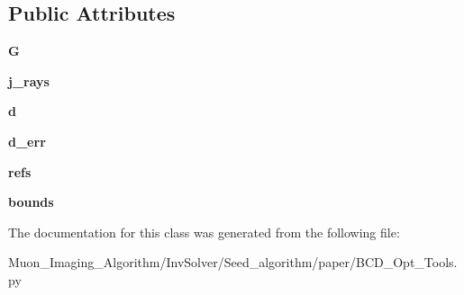 \subsection*{Public Attributes}
\begin{DoxyCompactItemize}
\item 
\mbox{\label{classBCD__Opt__Tools_1_1BCD__Opt__Tools_a806748cb84939f925ac6653158b79d83}} 
{\bfseries G}
\item 
\mbox{\label{classBCD__Opt__Tools_1_1BCD__Opt__Tools_ad9d2ae6a54cf8eca31190a872aa182f2}} 
{\bfseries j\+\_\+rays}
\item 
\mbox{\label{classBCD__Opt__Tools_1_1BCD__Opt__Tools_a5dbdb3bb1dbf4e053e6166b432c0b356}} 
{\bfseries d}
\item 
\mbox{\label{classBCD__Opt__Tools_1_1BCD__Opt__Tools_ae2b2cb8672df22d9d5c583798c1d2f8f}} 
{\bfseries d\+\_\+err}
\item 
\mbox{\label{classBCD__Opt__Tools_1_1BCD__Opt__Tools_ae1655eb7bc6e3ec51827475ae93a8fd5}} 
{\bfseries refs}
\item 
\mbox{\label{classBCD__Opt__Tools_1_1BCD__Opt__Tools_a6d47d2f005c8eac4978172d3207aa1f9}} 
{\bfseries bounds}
\end{DoxyCompactItemize}


The documentation for this class was generated from the following file\+:\begin{DoxyCompactItemize}
\item 
Muon\+\_\+\+Imaging\+\_\+\+Algorithm/\+Inv\+Solver/\+Seed\+\_\+algorithm/paper/B\+C\+D\+\_\+\+Opt\+\_\+\+Tools.\+py\end{DoxyCompactItemize}
